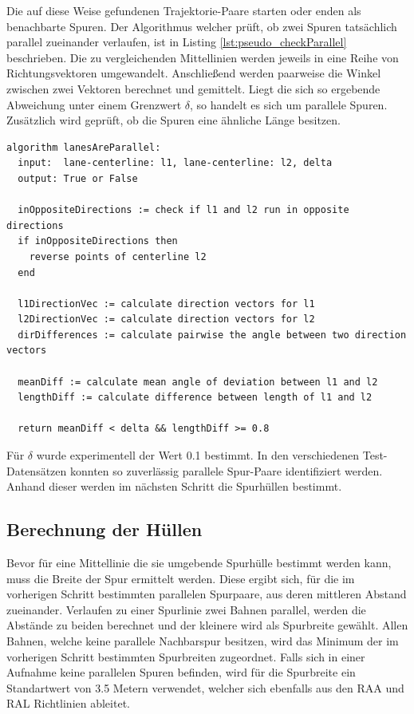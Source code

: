 Die auf diese Weise gefundenen Trajektorie-Paare starten oder enden als benachbarte Spuren.
Der Algorithmus welcher prüft, ob zwei Spuren tatsächlich parallel zueinander verlaufen, ist in Listing
\ref{lst:pseudo_checkParallel} beschrieben. Die zu vergleichenden Mittellinien werden jeweils in eine
Reihe von Richtungsvektoren umgewandelt. Anschließend werden paarweise die Winkel zwischen zwei Vektoren
berechnet und gemittelt.
Liegt die sich so ergebende Abweichung unter einem Grenzwert $\delta$, so handelt es sich um parallele Spuren.
Zusätzlich wird geprüft, ob die Spuren eine ähnliche Länge besitzen.
\begin{lstlisting}[caption=Pseudocode Überprüfung der Parallelität zweier Mittellinien, language=Pseudo, label=lst:pseudo_checkParallel]
algorithm lanesAreParallel:
  input:  lane-centerline: l1, lane-centerline: l2, delta
  output: True or False

  inOppositeDirections := check if l1 and l2 run in opposite directions
  if inOppositeDirections then
    reverse points of centerline l2
  end

  l1DirectionVec := calculate direction vectors for l1
  l2DirectionVec := calculate direction vectors for l2
  dirDifferences := calculate pairwise the angle between two direction vectors

  meanDiff := calculate mean angle of deviation between l1 and l2
  lengthDiff := calculate difference between length of l1 and l2

  return meanDiff < delta && lengthDiff >= 0.8
\end{lstlisting}

Für $\delta$ wurde experimentell der Wert 0.1 bestimmt. In den verschiedenen Test-Datensätzen konnten
so zuverlässig parallele Spur-Paare identifiziert werden. Anhand dieser werden im nächsten Schritt
die Spurhüllen bestimmt.

\subsection*{Berechnung der Hüllen}
\label{sec:real2_create_envelopes}


Bevor für eine Mittellinie die sie umgebende Spurhülle bestimmt werden kann, muss die Breite der Spur
ermittelt werden. Diese ergibt sich, für die im vorherigen Schritt bestimmten parallelen Spurpaare, aus
deren mittleren Abstand zueinander. Verlaufen zu einer Spurlinie zwei Bahnen parallel, werden
die Abstände zu beiden berechnet und der kleinere wird als Spurbreite gewählt.
Allen Bahnen, welche keine parallele Nachbarspur besitzen, wird das Minimum der im vorherigen Schritt bestimmten
Spurbreiten zugeordnet.
Falls sich in einer Aufnahme keine parallelen Spuren befinden, wird für die Spurbreite ein Standartwert
von 3.5 Metern verwendet, welcher sich ebenfalls aus den RAA und RAL Richtlinien ableitet.

